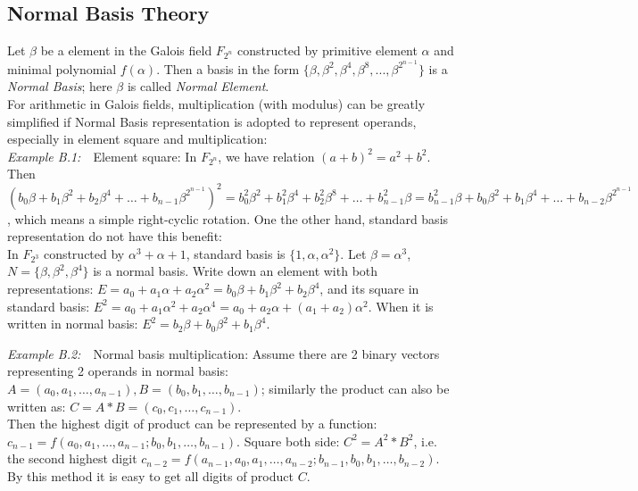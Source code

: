 \subsection{Normal Basis Theory}
Let $\beta$ be a element in the Galois field $F_{2^n}$ constructed by primitive element $\alpha$ and minimal polynomial 
$f(\alpha)$. Then a basis in the form $\{\beta, \beta^2, \beta^4, \beta^8, ... ,\beta^{2^{n-1}}\}$ is a
\emph{Normal Basis}; here $\beta$ is called \emph{Normal Element}.\\

For arithmetic in Galois fields, multiplication (with modulus) can be greatly simplified if Normal Basis representation 
is adopted to represent operands, especially in element square and multiplication:\\

\textit{Example B.1:}\ \ Element square: In $F_{2^n}$, we have relation $(a+b)^2 = a^2 + b^2$. Then 
$(b_0\beta + b_1\beta^2 + b_2\beta^4 + \dots + b_{n-1}\beta^{2^{n-1}})^2 = 
b_0^2\beta^2 + b_1^2\beta^4 + b_2^2\beta^8 + \dots + b_{n-1}^2\beta = 
b_{n-1}^2\beta + b_0\beta^2 + b_1\beta^4 + \dots + b_{n-2}\beta^{2^{n-1}}$, which means a simple right-cyclic rotation.
One the other hand, standard basis representation do not have this benefit:\\
In $F_{2^3}$ constructed by $\alpha^3 + \alpha + 1$, standard basis is $\{ 1, \alpha, \alpha^2\}$.
Let $\beta = \alpha^3$, $N = \{ \beta, \beta^2, \beta^4\}$ is a normal basis. Write down an element with both representations:
$E = a_0 + a_1\alpha + a_2\alpha^2 = b_0\beta + b_1\beta^2 + b_2\beta^4$, and its square in standard basis:
$E^2 = a_0 + a_1\alpha^2 + a_2\alpha^4 = a_0 + a_2\alpha + (a_1 + a_2)\alpha^2$. When it is written in normal basis:
$E^2 = b_2\beta + b_0\beta^2 + b_1\beta^4$.

\textit{Example B.2:}\ \ Normal basis multiplication: Assume there are 2 binary vectors representing 2 operands in normal
basis: $A = (a_0, a_1, \dots, a_{n-1}), B = (b_0, b_1, \dots, b_{n-1})$; similarly the product can also be written
as: $C = A*B = (c_0, c_1, \dots, c_{n-1}).$\\
Then the highest digit of product can be represented by a function: $c_{n-1} = f(a_0, a_1, \dots, a_{n-1}; b_0, b_1, 
\dots, b_{n-1})$. Square both side: $C^2 = A^2*B^2$, i.e. the second highest digit $c_{n-2} = f(a_{n-1}, a_0, a_1, 
\dots, a_{n-2}; b_{n-1}, b_0, b_1, \dots, b_{n-2}).$ By this method it is easy to get all digits of product $C$.\\

